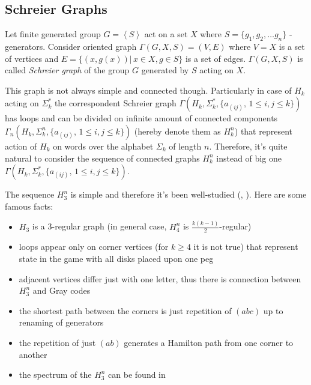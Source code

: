 \documentclass[a4paper,12pt]{amsart}
\begin{document}
\subsection{Schreier Graphs}

Let finite generated group $G = \left\langle S \right\rangle$ act on a set $X$ where $S = \{g_1, g_2, \dots g_n\}$ - generators. Consider oriented graph $\Gamma(G, X, S) = (V, E)$ where $V = X$ is a set of vertices and $E = \{(x, g(x)) | \, x \in X, g \in S\}$ is a set of edges. $\Gamma(G, X, S)$ is called \textit{Schreier graph} of the group $G$ generated by $S$ acting on $X$. 

This graph is not always simple and connected though. Particularly in case of $H_k$ acting on $\Sigma_k^*$ the correspondent Schreier graph $\Gamma(H_k, \Sigma_k^*, \{a_{(ij)}, \, 1 \le i, j \le k\})$ has loops and can be divided on infinite amount of connected components $\Gamma_n(H_k, \Sigma_k^n, \{a_{(ij)}, \, 1 \le i, j \le k\})$ (hereby denote them as $H_k^n$) that represent action of $H_k$ on words over the alphabet $\Sigma_k$ of length $n$. Therefore, it's quite natural to consider the sequence of connected graphs $H_k^n$ instead of big one $\Gamma(H_k, \Sigma_k^*, \{a_{(ij)}, \, 1 \le i, j \le k\})$.

The sequence $H_3^n$ is simple and therefore it's been well-studied (\cite{Hanoi Graphs Random walks}, \cite{Hanoi2}). Here are some famous facts: 

\begin{itemize}
	\item $H_3$ is a 3-regular graph (in general case, $H_4^n$ is $\frac{k(k-1)}{2}$-regular)
	
	\item loops appear only on corner vertices (for $k \ge 4$ it is not true) that represent state in the game with all disks placed upon one peg
	
	\item adjacent vertices differ just with one letter, thus there is connection between $H_3^n$ and Gray codes \cite{Gray-codes}
	
	\item the shortest path between the corners is just repetition of $(abc)$ up to renaming of generators
	
	\item the repetition of just $(ab)$ generates a Hamilton path from one corner to another
	
	\item the spectrum of the $H_3^n$ can be found in \cite{Hanoi2}
\end{itemize}
\end{document}
